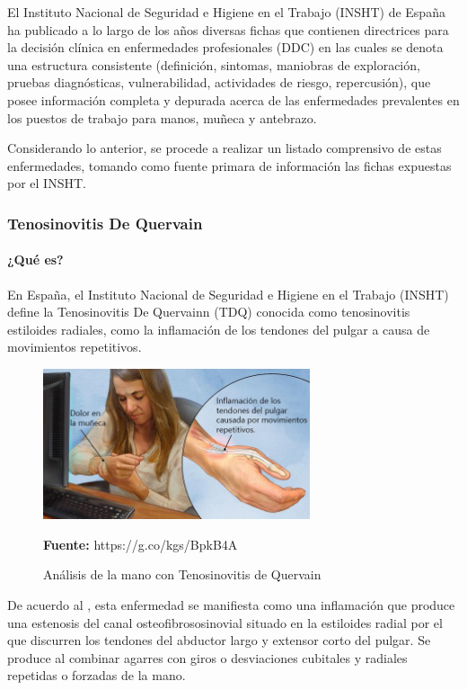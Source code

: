 El Instituto Nacional de Seguridad e Higiene en el Trabajo (INSHT) de España ha publicado a lo largo de los años diversas fichas que contienen directrices para la decisión clínica en enfermedades profesionales (DDC) en las cuales se denota una estructura consistente (definición, sintomas, maniobras de exploración, pruebas diagnósticas, vulnerabilidad, actividades de riesgo, repercusión), que posee información completa y depurada acerca de las enfermedades prevalentes en los puestos de trabajo para manos, muñeca y antebrazo.

Considerando lo anterior, se procede a realizar un listado comprensivo de estas enfermedades, tomando como fuente primara de información las fichas expuestas por el INSHT.

\subsubsection{Tenosinovitis De Quervain}
\paragraph{¿Qué es?}
En España, el Instituto Nacional de Seguridad e Higiene en el Trabajo (INSHT) define la Tenosinovitis De Quervainn (TDQ) conocida como tenosinovitis estiloides radiales, como la inflamación de los tendones del pulgar a causa de movimientos repetitivos. \parencite[1]{INSHT2017TendinitisPulgar}

\begin{figure}[H]
    \centering
    \includegraphics[width=0.7\textwidth]{Anexos/LATEX/chapters/images/TDQ.jpg}
    \caption{Análisis de la mano con Tenosinovitis de Quervain}
    \small{\textbf{Fuente:} https://g.co/kgs/BpkB4A}
    \label{TDQ}
\end{figure}

De acuerdo al \parencite[2]{INSHT2017TendinitisPulgar}, esta enfermedad se manifiesta como una inflamación que produce una estenosis del canal osteofibrososinovial situado en la estiloides radial por el que discurren los tendones del abductor largo y extensor corto del pulgar. Se produce al combinar agarres con giros o desviaciones cubitales y radiales repetidas o forzadas de la mano.
